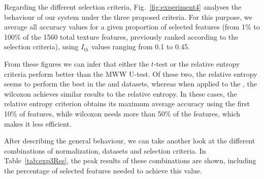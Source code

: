 Regarding the different selection criteria, Fig.~\ref{fig:experiment4} analyses the behaviour of our system under the three proposed criteria. For this purpose, we average all accuracy values for a given proportion of selected features (from 1\% to 100\% of the 1560 total texture features, previously ranked according to the selection criteria), using $I_{th}$ values ranging from 0.1 to 0.45. 

From these figures we can infer that either the $t$-test or the relative entropy criteria perform better than the \ac{MWW} U-test. Of these two, the relative entropy seems to perform the best in the \ppmidat{} and \vdlndat{}{} datasets, whereas when applied to the \vdlvdat{}, the wilcoxon achieves similar results to the relative entropy. In these cases, the relative entropy criterion obtains its maximum average accuracy using the first 10\% of features, while wilcoxon needs more than 50\% of the features, which makes it less efficient. 

After describing the general behaviour, we can take another look at the different combinations of normalization, datasets and selection criteria. In Table~\ref{tab:exp3Res}, the peak results of these combinations are shown, including the percentage of selected features needed to achieve this value. 

